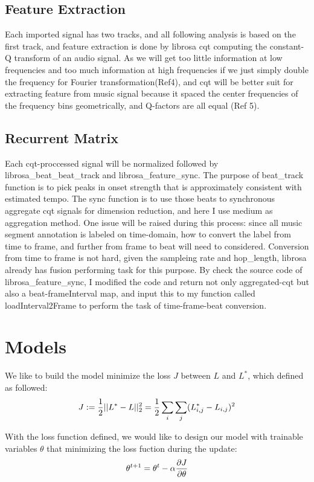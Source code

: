 \documentclass[final]{siamltexmm}
\begin{document}
\subsection{Feature Extraction}
Each imported signal has two tracks, and all following analysis is based on the first track, and feature extraction is done by librosa cqt computing the constant-Q transform of an audio signal. As we will get too little information at low frequencies and too much information at high frequencies if we just simply double the frequency for Fourier transformation(Ref4), and cqt will be better suit for extracting feature from music signal because it spaced the center frequencies of the frequency bins geometrically, and Q-factors are all equal (Ref 5).

\subsection{Recurrent Matrix}
Each cqt-proccessed signal will be normalized followed by librosa\_beat\_beat\_track and librosa\_feature\_sync. The purpose of beat\_track function is to pick peaks in onset strength that  is approximately consistent with estimated tempo. The sync function is to use those beats to synchronous aggregate cqt signals for dimension reduction, and here I use medium as aggregation method. One issue will be raised during this process: since all music segment annotation is labeled on time-domain, how to convert the label from time to frame, and further from frame to beat will need to considered. Conversion from time to frame is not hard, given the sampleing rate and hop\_length, librosa already has fusion performing task for this purpose. By check the source code of librosa\_feature\_sync, I modified the code and return not only aggregated-cqt but also a beat-frameInterval map, and input this to my function called loadInterval2Frame to perform the task of time-frame-beat conversion.

\section{Models}
We like to build the model minimize the loss $J$ between $L$ and $L^{\ast}$, which defined as followed:
\begin{equation}
J := {1 \over 2} || L^{\ast} - L ||^2_2
=
{1 \over 2}
\sum_{\substack{i}}
\sum_{\substack{j}}
(L^{\ast}_{i,j} - L_{i,j})^2
\end{equation}

With the loss function defined, we would like to design our model with trainable variables $\theta$ that minimizing the loss fuction during the update:
\begin{equation}
\theta^{t+1} = \theta^{t} - \alpha {\partial J \over \partial \theta}
\end{equation}
\end{document}
